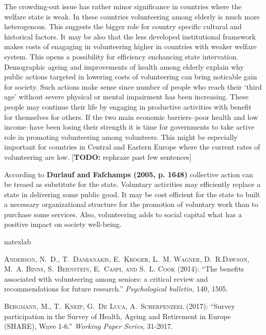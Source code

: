 \documentclass[10pt, letterpaper]{article}
\begin{document}
\begin{spacing}{1.4}
The crowding-out issue has rather minor significance in countries where the welfare state is weak. In these countries  volunteering among elderly is much more heterogenous. This suggests the bigger role for country specific cultural and historical factors. It may be also that the less developed  institutional framework makes costs of enagaging in volunteering higher in countries with weaker welfare system. This opens a possibility for efficiency enchancing state intervation. Demographic ageing and improvements of  health among elderly explain why public actions targeted in lowering costs of volunteering can bring noticable gain for society. Such actions make sense since number of people who reach their ‘third age’ without severe physical or mental impairment has been increasing. These people may continue their life by  engaging in productive activities with benefit for themselves for others. If the two main economic barriers--poor health and low income--have been losing their strength it is time for governments to take active role in promoting volunteering among volunteers. This might be especially important for countries in Central and Eastern Europe where the current rates of volunteering are low. [{\bf TODO:} rephraze past few sentences]

According to \textbf{Durlauf and Fafchamps (2005, p. 1648)} collective action can be treaed as substitute for the state. Voluntary activities may efficiently replace a state in delivering some public good. It may be cost efficient for the state to built a necessary organizational structure for the promotion of voluntary work than to purchase some services. Also, volunteering adds to social capital what has a positive impact on society well-being.  


\begin{thebibliography}{87}
\newcommand{\enquote}[1]{``#1''}
\expandafter\ifx\csname natexlab\endcsname\relax\def\natexlab#1{#1}\fi

\textsc{Anderson, N.~D., T.~Damianakis, E.~Kr{\"o}ger, L.~M. Wagner, D.~R.Dawson, M.~A. Binns, S.~Bernstein, E.~Caspi, and S.~L. Cook} (2014):  \enquote{The benefits associated with volunteering among seniors: a critical  review and recommendations for future research.} \emph{Psychological bulletin}, 140, 1505.

\textsc{Bergmann, M., T.~Kneip, G.~De Luca, A.~Scherpenzeel} (2017):  \enquote{Survey participation in the Survey of Health, Ageing and Retirement in Europe (SHARE), Wave 1-6.} \emph{Working Paper Series}, 31-2017.



\end{thebibliography}
\end{spacing}
\end{document}
